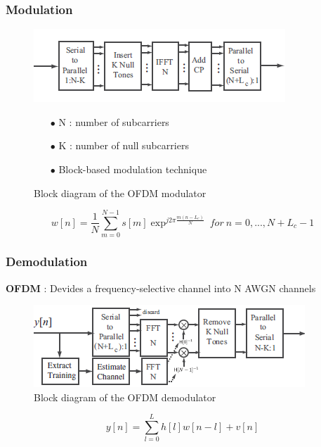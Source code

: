 \documentclass[11pt]{beamer}
\begin{document}
\begin{frame}
\frametitle{Modulation}

\begin{figure}[!ht]
    \begin{minipage}[b]{0.48\linewidth}
        \centering \includegraphics[scale=0.6]{img/OFDDM_modulator.png}
     \caption{Block diagram of the OFDM modulator}
     \label{fig2}
    \end{minipage}\hfill
    \begin{minipage}[b]{0.48\linewidth}  
    \centering  
    \begin{itemize}
    \item[$\bullet$] N : number of subcarriers
    \item[$\bullet$] K : number of null subcarriers
    \item[$\bullet$] Block-based modulation technique
    \end{itemize}
        
    \end{minipage}
\end{figure}
\begin{equation}
w[n]=\frac{1}{N} \sum_{m=0}^{N-1} s[m]\exp^{j2\pi\frac{m(n-L_c)}{N}}~for~n=0,...,N+L_c-1
\end{equation}
\end{frame}

\begin{frame}
\frametitle{Demodulation}

\textbf{OFDM} : Devides a frequency-selective channel into N AWGN channels

\begin{figure}[!ht]
         \centering \includegraphics[scale=0.75]{img/OFDDM_demodulator.png}
 \caption{Block diagram of the OFDM demodulator}\label{fig3}  
\end{figure}
\begin{equation}  
 y[n]=\sum_{l=0}^{L} h[l]w[n-l]+v[n]
 \end{equation}
 

\end{frame}
\end{document}

